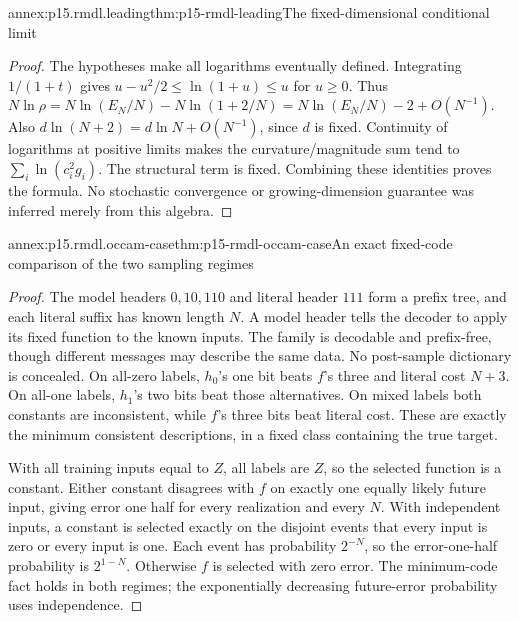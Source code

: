 \begin{annexitem}{annex:p15.rmdl.leading}{thm:p15-rmdl-leading}{The fixed-dimensional conditional limit}
\begin{proof}
The hypotheses make all logarithms eventually defined. Integrating
\(1/(1+t)\) gives \(u-u^2/2\leq\ln(1+u)\leq u\) for \(u\geq0\).
Thus
\(N\ln\rho=N\ln(E_N/N)-N\ln(1+2/N)
=N\ln(E_N/N)-2+O(N^{-1})\).
Also \(d\ln(N+2)=d\ln N+O(N^{-1})\), since \(d\) is fixed.
Continuity of logarithms at positive limits makes the curvature/magnitude
sum tend to \(\sum_i\ln(c_i^2g_i)\). The structural term is fixed.
Combining these identities proves the formula. No stochastic convergence
or growing-dimension guarantee was inferred merely from this algebra.
\end{proof}
\end{annexitem}

\begin{annexitem}{annex:p15.rmdl.occam-case}{thm:p15-rmdl-occam-case}{An exact fixed-code comparison of the two sampling regimes}
\begin{proof}
The model headers \(0,10,110\) and literal header \(111\) form a
prefix tree, and each literal suffix has known length \(N\).
A model header tells the decoder to apply its fixed function to the known
inputs. The family is decodable and prefix-free, though different messages
may describe the same data. No post-sample dictionary is concealed.
On all-zero labels, \(h_0\)'s one bit beats \(f\)'s three and literal
cost \(N+3\). On all-one labels, \(h_1\)'s two bits beat those
alternatives. On mixed labels both constants are inconsistent, while
\(f\)'s three bits beat literal cost. These are exactly the minimum
consistent descriptions, in a fixed class containing the true target.

With all training inputs equal to \(Z\), all labels are \(Z\), so
the selected function is a constant. Either constant disagrees with
\(f\) on exactly one equally likely future input, giving error one half
for every realization and every \(N\). With independent inputs, a
constant is selected exactly on the disjoint events that every input is
zero or every input is one. Each event has probability \(2^{-N}\),
so the error-one-half probability is \(2^{1-N}\). Otherwise \(f\)
is selected with zero error. The minimum-code fact holds in both regimes;
the exponentially decreasing future-error probability uses independence.
\end{proof}
\end{annexitem}
